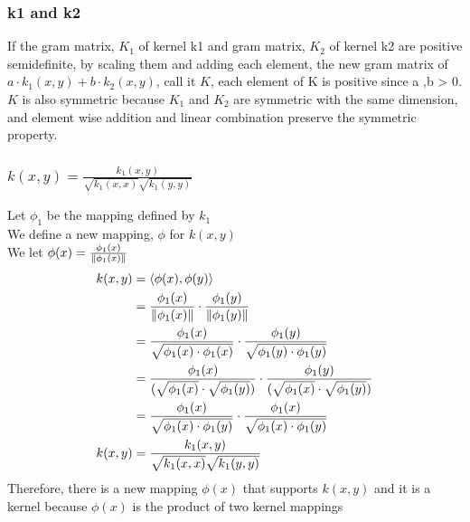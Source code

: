 \documentclass[letterpaper, 12]{article}
\begin{document}
\subsubsection{k1 and k2}
If the gram matrix, $K_{1}$ of kernel k1 and gram matrix, $K_{2}$ of kernel k2 are positive semidefinite, by scaling them and adding each element, the new gram matrix of $a \cdot k_{1}(x, y) + b \cdot k_{2}(x, y)$, call it $K$, each element of K is positive since a ,b > 0.\\
$K$ is also symmetric because $K_{1}$ and $K_{2}$ are symmetric with the same dimension, and element wise addition and linear combination preserve the symmetric property.\\

\subsubsection{$k(x, y) = \frac{k_{1}(x ,y) }{\sqrt{k_{1}(x, x)} \sqrt{k_{1}(y, y)} }$}
Let $\phi_{1}$ be the mapping defined by $k_{1}$\\
We define a new mapping, $\phi$ for $k(x ,y)$\\
We let $\phi(x) = \frac{\phi_{1} (x)}{\norm{\phi_{1}(x)}}$\\
\begin{equation*}
\begin{split}
k(x, y) &= \langle \phi (x), \phi (y) \rangle \\
&= \frac{\phi_{1}(x)}{\norm{\phi_{1}(x)}} \cdot  \frac{\phi_{1}(y)}{\norm{\phi_{1}(y)}}\\
&= \frac{\phi_{1}(x)}{\sqrt{\phi_{1}(x) \cdot \phi_{1}(x)}} \cdot \frac{\phi_{1}(y)}{\sqrt{\phi_{1}(y) \cdot \phi_{1}(y)}}\\
&= \frac{\phi_{1}(x)}{( \sqrt{\phi_{1}(x)} \cdot \sqrt{ \phi_{1}(y)}  )}  \cdot \frac{\phi_{1}(y)}{( \sqrt{\phi_{1}(x)} \cdot \sqrt{ \phi_{1}(y)}  )} \\
&= \frac{\phi_{1}(x)}{ \sqrt{\phi_{1}(x) \cdot  \phi_{1}(y) }}  \cdot  \frac{\phi_{1}(x)}{ \sqrt{\phi_{1}(x) \cdot  \phi_{1}(y) }}\\
 k(x, y) &= \frac{k_{1}(x ,y) }{\sqrt{k_{1}(x, x)} \sqrt{k_{1}(y, y)} }
\end{split}
\end{equation*}
Therefore, there is a new mapping $\phi(x)$ that supports $k(x, y)$ and it is a kernel because $\phi(x)$
is the product of two kernel mappings
\end{document}
